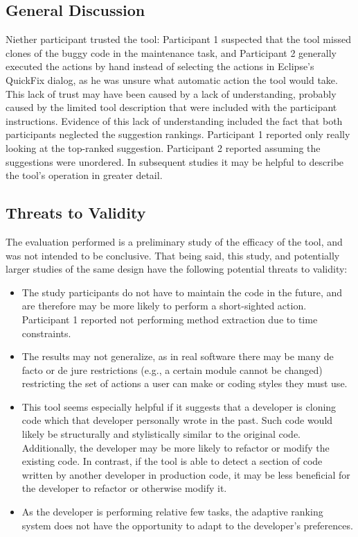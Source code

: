 \documentclass[nocopyrightspace,10pt]{sigplanconf}
\begin{document}
\subsection{General Discussion}
Niether participant trusted the tool: Participant 1 suspected that the
tool missed clones of the buggy code in the maintenance task, and
Participant 2 generally executed the actions by hand instead of
selecting the actions in Eclipse's QuickFix dialog, as he was unsure
what automatic action the tool would take. This lack of trust may have
been caused by a lack of understanding, probably caused by the limited
tool description that were included with the participant
instructions. Evidence of this lack of understanding included the fact
that both participants neglected the suggestion rankings. Participant
1 reported only really looking at the top-ranked
suggestion. Participant 2 reported assuming the suggestions were
unordered. In subsequent studies it may be helpful to describe the
tool's operation in greater detail.

\subsection{Threats to Validity}
The evaluation performed is a preliminary study of the efficacy of the
tool, and was not intended to be conclusive. That being said, this
study, and potentially larger studies of the same design have the 
following potential threats to validity:

\begin{itemize}
  \item The study participants do not have to maintain the code in the
    future, and are therefore may be more likely to perform a
    short-sighted action. Participant 1 reported not performing method
    extraction due to time constraints.
  \item The results may not generalize, as in real software there may
    be many de facto or de jure restrictions (e.g., a certain module cannot
    be changed) restricting the set of actions a user can make or coding styles 
    they must use. 
  \item This tool seems especially helpful if it suggests that a
    developer is cloning code which that developer personally wrote in
    the past.  Such code would likely be structurally and
    stylistically similar to the original code. Additionally, the
    developer may be more likely to refactor or modify the existing
    code. 
    In contrast, if the tool is able to detect a section of
    code written by another developer in production code, it may be
    less beneficial for the developer to refactor or otherwise modify
    it.
  \item As the developer is performing relative few tasks, the
    adaptive ranking system does not have the opportunity to adapt to
    the developer's preferences.
\end{itemize}
\end{document}

